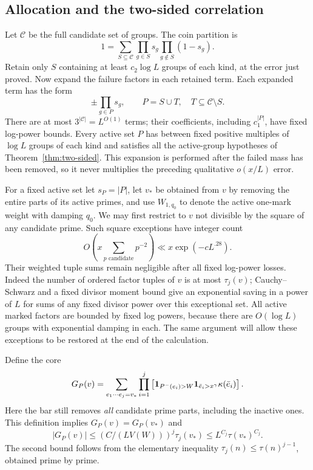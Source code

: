 \subsection{Allocation and the two-sided correlation}

Let $\mathcal C$ be the full candidate set of groups.  The coin
partition is
\[
 1=\sum_{S\subseteq\mathcal C}
       \prod_{g\in S}s_g\prod_{g\notin S}(1-s_g).
\]
Retain only $S$ containing at least $c_2\log L$ groups of each
kind, at the error just proved.  Now expand the failure factors
in each retained term.  Each expanded term has the form
\begin{equation}\label{ext:active-term}
 \pm\prod_{g\in P}s_g,
 \qquad P=S\cup T,\quad T\subseteq\mathcal C\setminus S.
\end{equation}
There are at most $3^{|\mathcal C|}=L^{O(1)}$ terms; their
coefficients, including $c_1^{|P|}$, have fixed log-power bounds.
Every active set $P$ has between fixed positive multiples of
$\log L$ groups of each kind and satisfies all the active-group
hypotheses of Theorem~\ref{thm:two-sided}.  This expansion is
performed after the failed mass has been removed, so it never
multiplies the preceding qualitative $o(x/L)$ error.

For a fixed active set let $s_P=|P|$, let $v_*$ be obtained from
$v$ by removing the entire parts of its active primes, and use
$W_{1,q_0}$ to denote the active one-mark weight with damping
$q_0$.  We may first restrict to $v$ not divisible by the square
of any candidate prime.  Such square exceptions have integer
count
\begin{equation}\label{ext:candidate-square-count}
 O\left(x\sum_{p\text{ candidate}}p^{-2}\right)
 \ll x\exp(-cL^{.28}).
\end{equation}
Their weighted tuple sums remain negligible after all fixed
log-power losses.  Indeed the number of ordered factor tuples
of $v$ is at most $\tau_j(v)$; Cauchy--Schwarz and a fixed
divisor moment bound give an exponential saving in a power of
$L$ for sums of any fixed divisor power over this exceptional
set.  All active marked factors are bounded by fixed log
powers, because there are $O(\log L)$ groups with exponential
damping in each.  The same argument will allow these exceptions
to be restored at the end of the calculation.

Define the core
\begin{equation}\label{ext:allocation-core}
 G_P(v)=\sum_{e_1\cdots e_j=v_*}
       \prod_{i=1}^j
       \left[\mathbf{1}_{P^-(e_i)>W}\mathbf{1}_{\bar e_i>x^\gamma}
                         \kappa(\bar e_i)\right].
\end{equation}
Here the bar still removes \emph{all} candidate prime parts,
including the inactive ones.  This definition implies
$G_P(v)=G_P(v_*)$ and
\begin{equation}\label{ext:core-bound}
 |G_P(v)|\leq (C/(LV(W)))^j\tau_j(v_*)
               \leq L^{C_j}\tau(v_*)^{C_j}.
\end{equation}
The second bound follows from the elementary inequality
$\tau_j(n)\leq\tau(n)^{j-1}$, obtained prime by prime.

